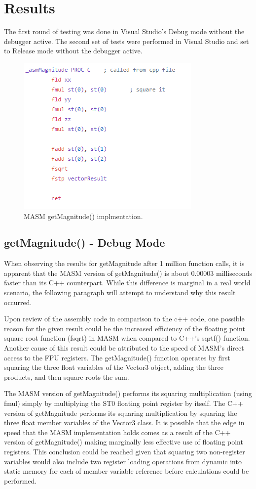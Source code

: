 \documentclass[12pt]{article}
\begin{document}
\clearpage
\section{Results}
The first round of testing was done in Visual Studio's Debug mode without the debugger active. The second set of tests were performed in Visual Studio and set to Release mode without the debugger active.

\begin{figure}[!htb]
  \centering
  \includegraphics[scale=1]{img/asmMagnitude.PNG}
  \caption{MASM getMagnitude() implmentation. }
  \label{fig:asmmag}
\end{figure}

\subsection{getMagnitude() - Debug Mode}
When observing the results for getMagnitude after 1 million function calls, it is apparent that the MASM version of getMagnitude() is about 0.00003 milliseconds faster than its C++ counterpart. While this difference is marginal in a real world scenario, the following paragraph will attempt to understand why this result occurred. 

Upon review of the assembly code in comparison to the c++ code, one possible reason for the given result could be the increased efficiency of the floating point square root function (fsqrt) in MASM when compared to C++'s sqrtf() function. Another cause of this result could be attributed to the speed of MASM's direct access to the FPU registers. The getMagnitude() function operates by first squaring the three float variables of the Vector3 object, adding the three products, and then square roots the sum. 

The MASM version of getMagnitude() performs its squaring multiplication (using fmul) simply by multiplying the ST0 floating point register by itself. The C++ version of getMagnitude performs its squaring multiplication by squaring the three float member variables of the Vector3 class. It is possible that the edge in speed that the MASM implementation holds comes as a result of the C++ version of getMagnitude() making marginally less effective use of floating point registers. This conclusion could be reached given that squaring two non-register variables would also include two register loading operations from dynamic into static memory for each of member variable reference before calculations could be performed. 
\end{document}
